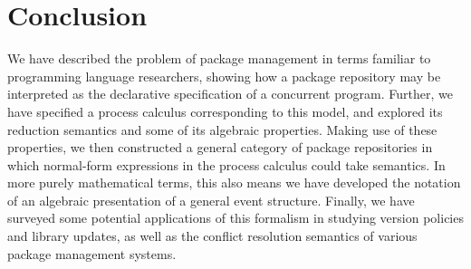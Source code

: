 \documentclass[hoptionsi,review,screen,format=sigconf]{acmart}
\theoremstyle{definition}
\begin{document}
\section{Conclusion}
We have described the problem of package management in terms familiar to programming language researchers, showing how a package repository may be interpreted as the declarative specification of a concurrent program. Further, we have specified a process calculus corresponding to this model, and explored its reduction semantics and some of its algebraic properties. Making use of these properties, we then constructed a general category of package repositories in which normal-form expressions in the process calculus could take semantics. In more purely mathematical terms, this also means we have developed the notation of an algebraic presentation of a general event structure. Finally, we have surveyed some potential applications of this formalism in studying version policies and library updates, as well as the conflict resolution semantics of various package management systems.











%
%
%
%
%
% 
%
%
%
\end{document}

